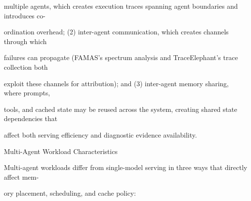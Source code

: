 \begin{flushleft}
\noindent multiple agents, which creates execution traces spanning agent boundaries and introduces co-\par
\noindent ordination overhead; (2) inter-agent communication, which creates channels through which\par
\noindent failures can propagate (FAMAS’s spectrum analysis and TraceElephant’s trace collection both\par
\noindent exploit these channels for attribution); and (3) inter-agent memory sharing, where prompts,\par
\noindent tools, and cached state may be reused across the system, creating shared state dependencies that\par
\noindent affect both serving efficiency and diagnostic evidence availability.\par
\par\smallskip
{} Multi-Agent Workload Characteristics\par
\noindent Multi-agent workloads differ from single-model serving in three ways that directly affect mem-\par
\noindent ory placement, scheduling, and cache policy:\par
\end{flushleft}
